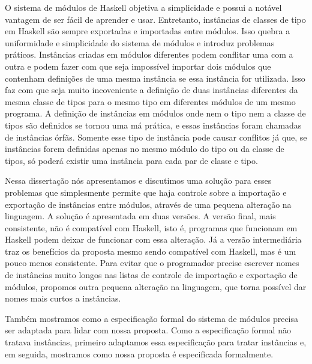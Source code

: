 O sistema de módulos de Haskell objetiva a simplicidade e possui a notável
vantagem de ser fácil de aprender e usar.  Entretanto, instâncias de classes
de tipo em Haskell são sempre exportadas e importadas entre módulos.  Isso
quebra a uniformidade e simplicidade do sistema de módulos e introduz problemas
práticos.  Instâncias criadas em módulos diferentes podem conflitar uma com a
outra e podem fazer com que seja impossível importar dois módulos que contenham
definições de uma mesma instância se essa instância for utilizada.  Isso faz com que seja
muito incoveniente a definição de duas instâncias diferentes da mesma classe de
tipos para o mesmo tipo em diferentes módulos de um mesmo programa.  A definição
de instâncias em módulos onde nem o tipo nem a classe de tipos são definidos se tornou uma má prática, e essas
instâncias foram chamadas de instâncias órfãs.  Somente esse tipo de instância
pode causar conflitos já que, se instâncias forem definidas apenas no
mesmo módulo do tipo ou da classe de tipos, só poderá existir uma instância para
cada par de classe e tipo.

Nessa dissertação
nós apresentamos e discutimos uma solução para esses problemas que simplesmente
permite que haja controle sobre a importação e exportação de instâncias entre
módulos, através de uma pequena alteração na linguagem.  A solução é apresentada
em duas versões.  A versão final, mais consistente, não é compatível com
Haskell, isto é, programas que funcionam em Haskell podem deixar de funcionar
com essa alteração.  Já a versão intermediária traz os benefícios da proposta
mesmo sendo compatível com Haskell, mas é um pouco menos consistente.
Para evitar que o programador precise escrever nomes de instâncias muito longos
nas listas de controle de importação e exportação de módulos, propomos
outra pequena alteração na linguagem, que torna possível dar nomes mais curtos a
instâncias.

Também mostramos como a especificação formal do sistema de módulos precisa
ser adaptada para lidar com nossa proposta.  Como a especificação formal não
tratava instâncias, primeiro adaptamos essa especificação
para tratar instâncias e, em seguida, mostramos como nossa proposta é
especificada formalmente.

